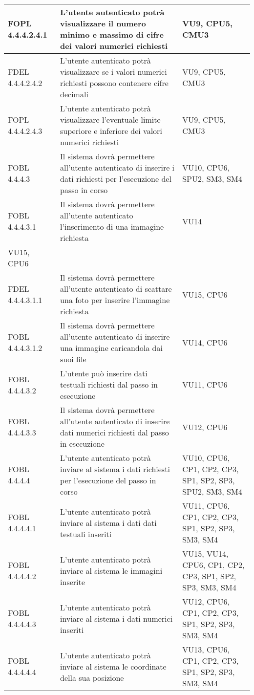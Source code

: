 \begin{longtable}{lXp{}}
\midrule
FOPL 4.4.4.2.4.1&L'utente autenticato potrà visualizzare il numero minimo e massimo di cifre dei valori numerici richiesti&VU9, CPU5, CMU3\\
\midrule
FDEL 4.4.4.2.4.2&L'utente autenticato potrà visualizzare se i valori numerici richiesti possono contenere cifre decimali&VU9, CPU5, CMU3\\
\midrule
FOPL 4.4.4.2.4.3&L'utente autenticato potrà visualizzare l'eventuale limite superiore e inferiore dei valori numerici richiesti&VU9, CPU5, CMU3\\
\midrule
FOBL 4.4.4.3&Il sistema dovrà permettere all'utente autenticato di inserire i dati richiesti per l'esecuzione del passo in corso&VU10, CPU6, SPU2, SM3, SM4\\
\midrule
FOBL 4.4.4.3.1&Il sistema dovrà permettere all'utente autenticato l'inserimento di una immagine richiesta&VU14\\
VU15, CPU6\\
\midrule
FDEL 4.4.4.3.1.1&Il sistema dovrà permettere all'utente autenticato di scattare una foto per inserire l'immagine richiesta&VU15, CPU6\\
\midrule
FOBL 4.4.4.3.1.2&Il sistema dovrà permettere all'utente autenticato di inserire una immagine caricandola dai suoi file&VU14, CPU6\\
\midrule
FOBL 4.4.4.3.2&L'utente può inserire dati testuali richiesti dal passo in esecuzione&VU11, CPU6\\
\midrule
FOBL 4.4.4.3.3&Il sistema dovrà permettere all'utente autenticato di inserire dati numerici richiesti dal passo in esecuzione&VU12, CPU6\\
\midrule
FOBL 4.4.4.4&L'utente autenticato potrà inviare al sistema i dati richiesti per l'esecuzione del passo in corso&VU10, CPU6, CP1, CP2, CP3, SP1, SP2, SP3, SPU2, SM3, SM4\\
\midrule
FOBL 4.4.4.4.1&L'utente autenticato potrà inviare al sistema i dati dati testuali inseriti&VU11, CPU6, CP1, CP2, CP3, SP1, SP2, SP3, SM3, SM4\\
\midrule
FOBL 4.4.4.4.2&L'utente autenticato potrà inviare al sistema le immagini inserite&VU15, VU14, CPU6, CP1, CP2, CP3, SP1, SP2, SP3, SM3, SM4\\
\midrule
FOBL 4.4.4.4.3&L'utente autenticato potrà inviare al sistema i dati numerici inseriti&VU12, CPU6, CP1, CP2, CP3, SP1, SP2, SP3, SM3, SM4\\
\midrule
FOBL 4.4.4.4.4&L'utente autenticato potrà inviare al sistema le coordinate della sua posizione&VU13, CPU6, CP1, CP2, CP3, SP1, SP2, SP3, SM3, SM4\\

\end{longtable}
